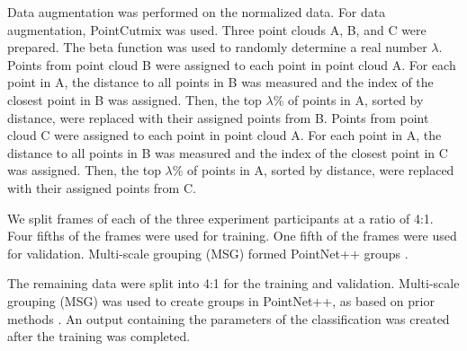   \begin{deletedblock}
  Data augmentation was performed on the normalized data. 
    For data augmentation, PointCutmix was used\cite{ZHANG202258}. 
        Three point clouds A, B, and C were prepared. 
        The beta function was used to randomly determine a real number $\lambda$. 
        Points from point cloud B were assigned to each point in point cloud A. 
            For each point in A, the distance to all points in B was measured and the index of the closest point in B was assigned. 
            Then, the top $\lambda$\% of points in A, sorted by distance, were replaced with their assigned points from B. 
        Points from point cloud C were assigned to each point in point cloud A. 
            For each point in A, the distance to all points in B was measured and the index of the closest point in C was assigned. 
            Then, the top $\lambda$\% of points in A, sorted by distance, were replaced with their assigned points from C. 
  \end{deletedblock}

\begin{revisedblock}
We split frames of each of the three experiment participants at a ratio of 4:1.
  Four fifths of the frames were used for training.
  One fifth of the frames were used for validation.
Multi-scale grouping (MSG) formed PointNet++ groups \cite{pytorchpointnet++,PytorchPointnetPointnet2}.
\end{revisedblock}
\begin{deletedblock}
The remaining data were split into 4:1 for the training and validation. 
Multi-scale grouping (MSG) was used to create groups in PointNet++, as based on prior methods \cite{pytorchpointnet++,PytorchPointnetPointnet2}.
An output containing the parameters of the classification was created after the training was completed. 
\end{deletedblock}
